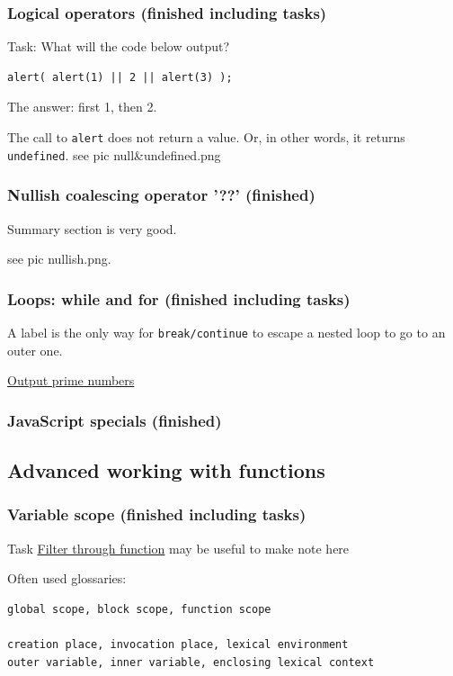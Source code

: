 \documentclass[a4paper, 12pt]{article}
\begin{document}
\subsubsection{Logical operators (finished including tasks)}
Task: What will the code below output?
\begin{verbatim}
alert( alert(1) || 2 || alert(3) );
\end{verbatim}
The answer: first 1, then 2.

The call to \verb|alert| does not return a value. Or, in other words, it returns \verb|undefined|. see pic null\&undefined.png

\subsubsection{Nullish coalescing operator '??' (finished)}
Summary section is very good.

see pic nullish.png.

\subsubsection{Loops: while and for (finished including tasks)}
A label is the only way for \verb|break/continue| to escape a nested loop to go to an outer one.

\href{https://javascript.info/while-for#output-prime-numbers}{Output prime numbers}

\subsubsection{JavaScript specials (finished)}

\subsection{Advanced working with functions}
\subsubsection{Variable scope (finished including tasks)}
Task \href{https://javascript.info/closure#filter-through-function}{Filter through function} may be useful to make note here

\noindent Often used glossaries:
\begin{verbatim}
global scope, block scope, function scope

creation place, invocation place, lexical environment
outer variable, inner variable, enclosing lexical context
\end{verbatim}
\end{document}
